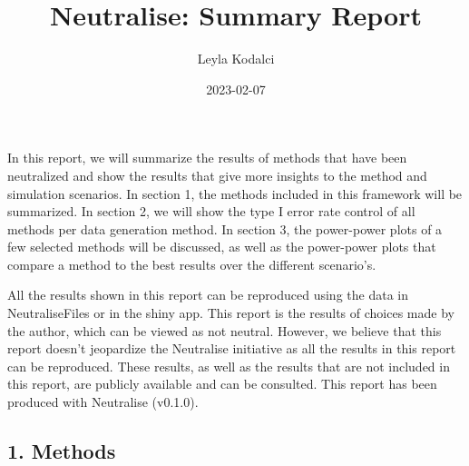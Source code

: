 \documentclass[
]{article}
\title{Neutralise: Summary Report}
\author{Leyla Kodalci}
\date{2023-02-07}
\begin{document}
\maketitle

In this report, we will summarize the results of methods that have been
neutralized and show the results that give more insights to the method
and simulation scenarios. In section 1, the methods included in this
framework will be summarized. In section 2, we will show the type I
error rate control of all methods per data generation method. In section
3, the power-power plots of a few selected methods will be discussed, as
well as the power-power plots that compare a method to the best results
over the different scenario's.

All the results shown in this report can be reproduced using the data in
NeutraliseFiles or in the shiny app. This report is the results of
choices made by the author, which can be viewed as not neutral. However,
we believe that this report doesn't jeopardize the Neutralise initiative
as all the results in this report can be reproduced. These results, as
well as the results that are not included in this report, are publicly
available and can be consulted. This report has been produced with
Neutralise (v0.1.0).

\hypertarget{methods}{%
\subsection{1. Methods}\label{methods}}

\renewcommand{\arraystretch}{2}
\end{document}
